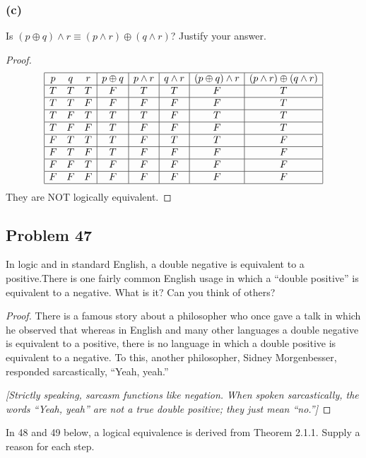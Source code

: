 \documentclass[14pt]{extarticle}
\begin{document}
\subsubsection{(c)}
Is $(p \oplus q) \wedge r \equiv (p \wedge r) \oplus (q \wedge r)$? Justify your
answer.

\begin{proof}
$$
\begin{array}{|ccc|c|c|c|c|c|}
\hline
p & q & r & p \oplus q & p \wedge r & q \wedge r & 
(p \oplus q) \wedge r & (p \wedge r) \oplus (q \wedge r) \\
\hline
T & T & T & F & T & T & F & T \\
\hline
T & T & F & F & F & F & F & T \\
\hline
T & F & T & T & T & F & T & T \\
\hline
T & F & F & T & F & F & F & T \\
\hline
F & T & T & T & F & T & T & F \\
\hline
F & T & F & T & F & F & F & F \\
\hline
F & F & T & F & F & F & F & F \\
\hline
F & F & F & F & F & F & F & F \\
\hline
\end{array}
$$
They are NOT logically equivalent.
\end{proof}

\subsection{Problem 47}
In logic and in standard English, a double negative is equivalent to a
positive.There is one fairly common English usage in which a “double positive”
is equivalent to a negative. What is it? Can you think of others?

\begin{proof}
There is a famous story about a philosopher who once gave a talk in which he
observed that whereas in English and many other languages a double negative is
equivalent to a positive, there is no language in which a double positive is
equivalent to a negative. To this, another philosopher, Sidney Morgenbesser,
responded sarcastically, “Yeah, yeah.”

{\it [Strictly speaking, sarcasm functions like negation. When spoken
sarcastically, the words “Yeah, yeah” are not a true double positive; they just
mean “no.”]}
\end{proof}

In 48 and 49 below, a logical equivalence is derived from Theorem 2.1.1. Supply
a reason for each step.
\end{document}
